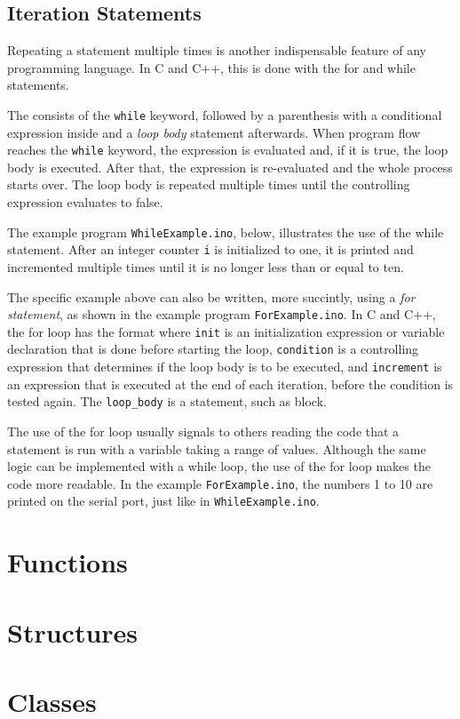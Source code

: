 \subsection{Iteration Statements}
Repeating a statement multiple times is another indispensable feature of any programming language.
In C and C++, this is done with the for and while statements.

The  consists of the \texttt{while} keyword, followed by a parenthesis with a conditional expression inside and a \emph{loop body} statement afterwards.
When program flow reaches the \texttt{while} keyword, the expression is evaluated and, if it is true, the loop body is executed.
After that, the expression is re-evaluated and the whole process starts over.
The loop body is repeated multiple times until the controlling expression evaluates to false.

The example program \texttt{WhileExample.ino}, below, illustrates the use of the while statement.
After an integer counter \texttt{i} is initialized to one, it is printed and incremented multiple times until it is no longer less than or equal to ten.


The specific example above can also be written, more succintly, using a \emph{for statement}, as shown in the example program \texttt{ForExample.ino}.
In C and C++, the for loop has the format  where \texttt{init} is an initialization expression or variable declaration that is done before starting the loop, \texttt{condition} is a controlling expression that determines if the loop body is to be executed, and \texttt{increment} is an expression that is executed at the end of each iteration, before the condition is tested again.
The \texttt{loop\_body} is a statement, such as block.


The use of the for loop usually signals to others reading the code that a statement is run with a variable taking a range of values.
Although the same logic can be implemented with a while loop, the use of the for loop makes the code more readable.
In the example \texttt{ForExample.ino}, the numbers 1 to 10 are printed on the serial port, just like in \texttt{WhileExample.ino}.

\section{Functions}
\section{Structures}
\section{Classes}


